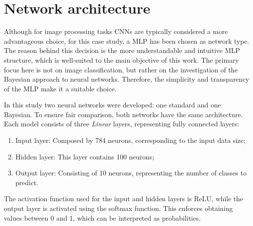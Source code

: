 \section{Network architecture}

Although for image processing tasks CNNs are typically considered a more advantageous choice, for this case study, a MLP has been chosen as network type. The reason behind this decision is the more understandable and intuitive MLP structure, which is well-suited to the main objective of this work. The primary focus here is not on image classification, but rather on the investigation of the Bayesian approach to neural networks. Therefore, the simplicity and transparency of the MLP make it a suitable choice.

In this study two neural networks were developed: one standard and one Bayesian. To ensure fair comparison, both networks have the same architecture. Each model consists of three \textit{Linear} layers, representing fully connected layers:

\begin{enumerate}
	\item Input layer: Composed by 784 neurons, corresponding to the input data size;
	\item Hidden layer: This layer contains 100 neurons;
	\item Output layer: Consisting of 10 neurons, representing the number of classes to predict.
\end{enumerate}

The activation function used for the input and hidden layers is ReLU, while the output layer is activated using the softmax function. This enforces obtaining values between 0 and 1, which can be interpreted as probabilities.